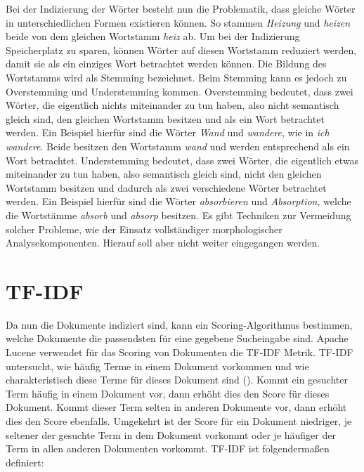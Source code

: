 
Bei der Indizierung der Wörter besteht nun die Problematik, dass gleiche Wörter in unterschiedlichen Formen existieren können.
So stammen \textit{Heizung} und \textit{heizen} beide von dem gleichen Wortstamm \textit{heiz} ab.
Um bei der Indizierung Speicherplatz zu sparen, können Wörter auf diesen Wortstamm reduziert werden, damit sie als ein einziges Wort betrachtet werden können.
Die Bildung des Wortstamms wird als Stemming bezeichnet.
Beim Stemming kann es jedoch zu Overstemming und Understemming kommen.
Overstemming bedeutet, dass zwei Wörter, die eigentlich nichts miteinander zu tun haben, also nicht semantisch gleich sind, den gleichen Wortstamm besitzen und als ein Wort betrachtet werden.
Ein Beispiel hierfür sind die Wörter \textit{Wand} und \textit{wandere}, wie in \textit{ich wandere}.
Beide besitzen den Wortstamm \textit{wand} und werden entsprechend als ein Wort betrachtet.
Understemming bedeutet, dass zwei Wörter, die eigentlich etwas miteinander zu tun haben, also semantisch gleich sind, nicht den gleichen Wortstamm besitzen und dadurch als zwei verschiedene Wörter betrachtet werden.
Ein Beispiel hierfür sind die Wörter \textit{absorbieren} und \textit{Absorption}, welche die Wortstämme \textit{absorb} und \textit{absorp} besitzen.
Es gibt Techniken zur Vermeidung solcher Probleme, wie der Einsatz vollständiger morphologischer Analysekomponenten.
Hierauf soll aber nicht weiter eingegangen werden.\\

\section{TF-IDF}
Da nun die Dokumente indiziert sind, kann ein Scoring-Algorithmus bestimmen, welche Dokumente die passendsten für eine gegebene Sucheingabe sind.
Apache Lucene verwendet für das Scoring von Dokumenten die TF-IDF Metrik.
TF-IDF untersucht, wie häufig Terme in einem Dokument vorkommen und wie charakteristisch diese Terme für dieses Dokument sind (\cite{Manning_Raghavan_Schuetze_2019}).
Kommt ein gesuchter Term häufig in einem Dokument vor, dann erhöht dies den Score für dieses Dokument.
Kommt dieser Term selten in anderen Dokumente vor, dann erhöht dies den Score ebenfalls.
Umgekehrt ist der Score für ein Dokument niedriger, je seltener der gesuchte Term in dem Dokument vorkommt oder je häufiger der Term in allen anderen Dokumenten vorkommt.
TF-IDF ist folgendermaßen definiert:\\

